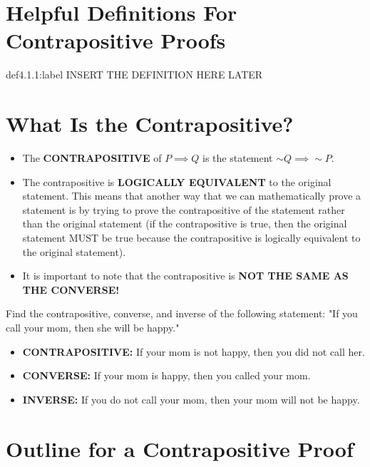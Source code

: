 \section{Helpful Definitions For Contrapositive Proofs}

\begin{definition}{def4.1.1:label}
    INSERT THE DEFINITION HERE LATER
\end{definition}


\section{What Is the Contrapositive?}

\begin{itemize}
	\item The \textbf{CONTRAPOSITIVE} of $P \implies Q$ is the statement $\sim Q \implies \sim P$.\\

	\item The contrapositive is \textbf{LOGICALLY EQUIVALENT} to the original statement. This means that another way that we can mathematically prove a statement is by trying to prove the contrapositive of the statement rather than the original statement (if the contrapositive is true, then the original statement MUST be true because the contrapositive is logically equivalent to the original statement).\\
	
	\item It is important to note that the contrapositive is \textbf{NOT THE SAME AS THE CONVERSE!}
\end{itemize}

\begin{problem}
	Find the contrapositive, converse, and inverse of the following statement: "If you call your mom, then she will be happy."\\

	\begin{itemize}
		\item \textbf{CONTRAPOSITIVE:} If your mom is not happy, then you did not call her.
		\item \textbf{CONVERSE:} If your mom is happy, then you called your mom.
		\item \textbf{INVERSE:} If you do not call your mom, then your mom will not be happy.
	\end{itemize}
\end{problem}


\newpage
\section{Outline for a Contrapositive Proof}

